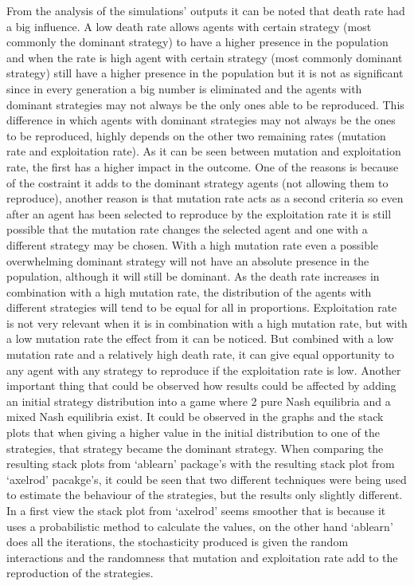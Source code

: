 From the analysis of the simulations' outputs it can be noted that death rate had a big influence. A low death rate allows agents with certain strategy (most commonly the dominant strategy) to have a higher presence in the population  and when the rate is high agent with certain strategy (most commonly dominant strategy) still have a higher presence in the population but it is not as significant since in every generation a big number is eliminated and the agents with dominant strategies may not always be the only ones able to be reproduced. This difference in which agents with dominant strategies may not always be the ones to be reproduced, highly depends on the other two remaining rates (mutation rate and exploitation rate). As it can be seen between mutation and exploitation rate, the first has a higher impact in the outcome. One of the reasons is because of the costraint it adds to the dominant strategy agents (not allowing them to reproduce), another reason is that mutation rate acts as a second criteria so even after an agent has been selected to reproduce by the exploitation rate it is still possible that the mutation rate changes the selected agent and one with a different strategy may be chosen.  With a high mutation rate even a possible overwhelming dominant strategy will not have an absolute presence in the population, although it will still be dominant. As the death rate increases in combination with a high mutation rate, the distribution of the agents with different strategies will tend to be equal for all in proportions. Exploitation rate is not very relevant when it is in combination with a high mutation rate, but with a low mutation rate the effect from it can be noticed. But combined with a low mutation rate and a relatively high death rate, it can give equal opportunity to any agent with any strategy to reproduce if the exploitation rate is low. Another important thing that could be observed how results could be affected by adding an initial strategy distribution into a game where 2 pure Nash equilibria and a mixed Nash equilibria exist. It could be observed in the graphs and the stack plots that when giving a higher value in the initial distribution to one of the strategies, that strategy became the dominant strategy.
When comparing the resulting stack plots from `ablearn' package's with the resulting stack plot from `axelrod' pacakge's, it could be seen  that two different techniques were being used to estimate the behaviour of the strategies, but the results only slightly different. In a first view the stack plot from `axelrod' seems smoother that is because it uses a probabilistic method to calculate the values, on the other hand `ablearn' does all the iterations, the stochasticity produced is given the random interactions and the randomness that mutation and exploitation rate add to the reproduction of the strategies.

